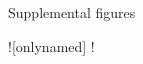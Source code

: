 
\ShowBackBib  %

\begin{Appendices}

\begin{Appendix}{Supplemental figures}
\end{Appendix}

\ShowListOfTheorems![onlynamed]  %
\ShowListOfSourceCode!
\end{Appendices}

\ShowIndex
